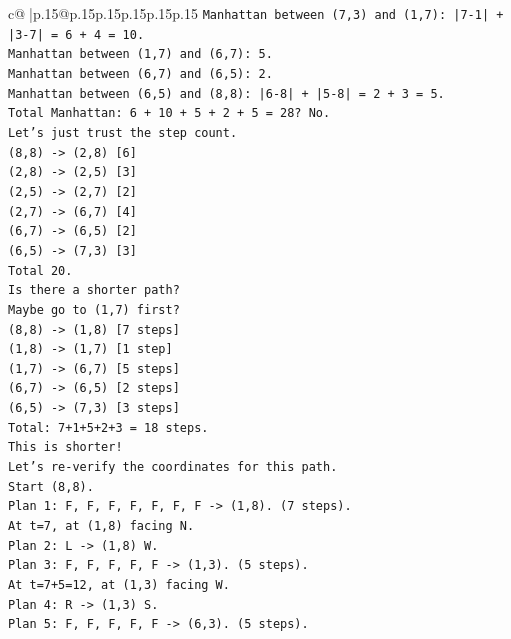 \documentclass{article}
\begin{document}
{\begin{supertabular}{c@{$\;$}|p{.15\linewidth}@{}p{.15\linewidth}p{.15\linewidth}p{.15\linewidth}p{.15\linewidth}p{.15\linewidth}}
{{{\texttt{Manhattan between (7,3) and (1,7): |7{-}1| + |3{-}7| = 6 + 4 = 10.} \\
\texttt{Manhattan between (1,7) and (6,7): 5.} \\
\texttt{Manhattan between (6,7) and (6,5): 2.} \\
\texttt{Manhattan between (6,5) and (8,8): |6{-}8| + |5{-}8| = 2 + 3 = 5.} \\
\texttt{Total Manhattan: 6 + 10 + 5 + 2 + 5 = 28? No.} \\
\texttt{Let's just trust the step count.} \\
\texttt{(8,8) {-}> (2,8) {[}6{]}} \\
\texttt{(2,8) {-}> (2,5) {[}3{]}} \\
\texttt{(2,5) {-}> (2,7) {[}2{]}} \\
\texttt{(2,7) {-}> (6,7) {[}4{]}} \\
\texttt{(6,7) {-}> (6,5) {[}2{]}} \\
\texttt{(6,5) {-}> (7,3) {[}3{]}} \\
\texttt{Total 20.} \\
\texttt{Is there a shorter path?} \\
\texttt{Maybe go to (1,7) first?} \\
\texttt{(8,8) {-}> (1,8) {[}7 steps{]}} \\
\texttt{(1,8) {-}> (1,7) {[}1 step{]}} \\
\texttt{(1,7) {-}> (6,7) {[}5 steps{]}} \\
\texttt{(6,7) {-}> (6,5) {[}2 steps{]}} \\
\texttt{(6,5) {-}> (7,3) {[}3 steps{]}} \\
\texttt{Total: 7+1+5+2+3 = 18 steps.} \\
\texttt{This is shorter!} \\
\texttt{Let's re{-}verify the coordinates for this path.} \\
\texttt{Start (8,8).} \\
\texttt{Plan 1: F, F, F, F, F, F, F {-}> (1,8). (7 steps).} \\
\texttt{At t=7, at (1,8) facing N.} \\
\texttt{Plan 2: L {-}> (1,8) W.} \\
\texttt{Plan 3: F, F, F, F, F {-}> (1,3). (5 steps).} \\
\texttt{At t=7+5=12, at (1,3) facing W.} \\
\texttt{Plan 4: R {-}> (1,3) S.} \\
\texttt{Plan 5: F, F, F, F, F {-}> (6,3). (5 steps).} \\
}}}
\end{supertabular}}
\end{document}
